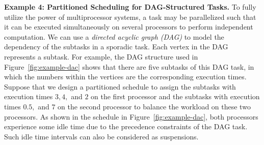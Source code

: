 {\bf Example 4: Partitioned Scheduling for DAG-Structured Tasks.}
To fully utilize the power of multiprocessor systems, a task may be parallelized such that it can be executed simultaneously on several processors to perform independent computation. We can use a \emph{directed acyclic graph (DAG)} to model the dependency of the subtasks in a sporadic task. Each vertex in the DAG represents a subtask. For example, the DAG structure used in Figure~\ref{fig:example-dac} shows that there are five subtasks of this DAG task, in which the numbers within the vertices are the corresponding execution times. Suppose that we design a partitioned schedule to assign the subtasks with execution times $3,4,$ and $2$ on the first processor and the subtasks with execution times $0.5,$ and $7$ on the second processor to balance the workload on these two processors. As shown in the schedule in Figure~\ref{fig:example-dac}, both processors experience some idle time 
due to the precedence constraints of the DAG task. Such idle time intervals can also be considered as suspensions. 




